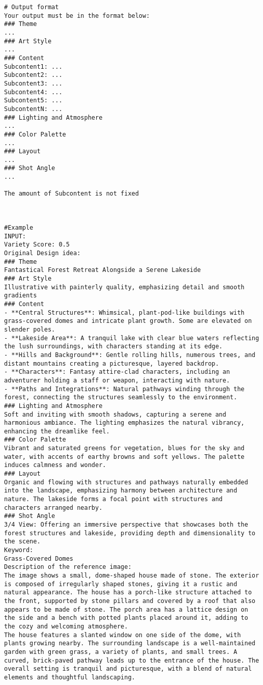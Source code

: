 \begin{lstlisting}
# Output format
Your output must be in the format below:
### Theme
...
### Art Style
...
### Content
Subcontent1: ...
Subcontent2: ...
Subcontent3: ...
Subcontent4: ...
Subcontent5: ...
SubcontentN: ...
### Lighting and Atmosphere
...
### Color Palette
...
### Layout
...
### Shot Angle
...

The amount of Subcontent is not fixed



#Example
INPUT:
Variety Score: 0.5
Original Design idea:
### Theme
Fantastical Forest Retreat Alongside a Serene Lakeside
### Art Style
Illustrative with painterly quality, emphasizing detail and smooth gradients
### Content
- **Central Structures**: Whimsical, plant-pod-like buildings with grass-covered domes and intricate plant growth. Some are elevated on slender poles.
- **Lakeside Area**: A tranquil lake with clear blue waters reflecting the lush surroundings, with characters standing at its edge.
- **Hills and Background**: Gentle rolling hills, numerous trees, and distant mountains creating a picturesque, layered backdrop.
- **Characters**: Fantasy attire-clad characters, including an adventurer holding a staff or weapon, interacting with nature.
- **Paths and Integrations**: Natural pathways winding through the forest, connecting the structures seamlessly to the environment.
### Lighting and Atmosphere
Soft and inviting with smooth shadows, capturing a serene and harmonious ambiance. The lighting emphasizes the natural vibrancy, enhancing the dreamlike feel.
### Color Palette
Vibrant and saturated greens for vegetation, blues for the sky and water, with accents of earthy browns and soft yellows. The palette induces calmness and wonder.
### Layout
Organic and flowing with structures and pathways naturally embedded into the landscape, emphasizing harmony between architecture and nature. The lakeside forms a focal point with structures and characters arranged nearby.
### Shot Angle
3/4 View: Offering an immersive perspective that showcases both the forest structures and lakeside, providing depth and dimensionality to the scene.
Keyword:
Grass-Covered Domes
Description of the reference image:
The image shows a small, dome-shaped house made of stone. The exterior is composed of irregularly shaped stones, giving it a rustic and natural appearance. The house has a porch-like structure attached to the front, supported by stone pillars and covered by a roof that also appears to be made of stone. The porch area has a lattice design on the side and a bench with potted plants placed around it, adding to the cozy and welcoming atmosphere.
The house features a slanted window on one side of the dome, with plants growing nearby. The surrounding landscape is a well-maintained garden with green grass, a variety of plants, and small trees. A curved, brick-paved pathway leads up to the entrance of the house. The overall setting is tranquil and picturesque, with a blend of natural elements and thoughtful landscaping.


\end{lstlisting}
